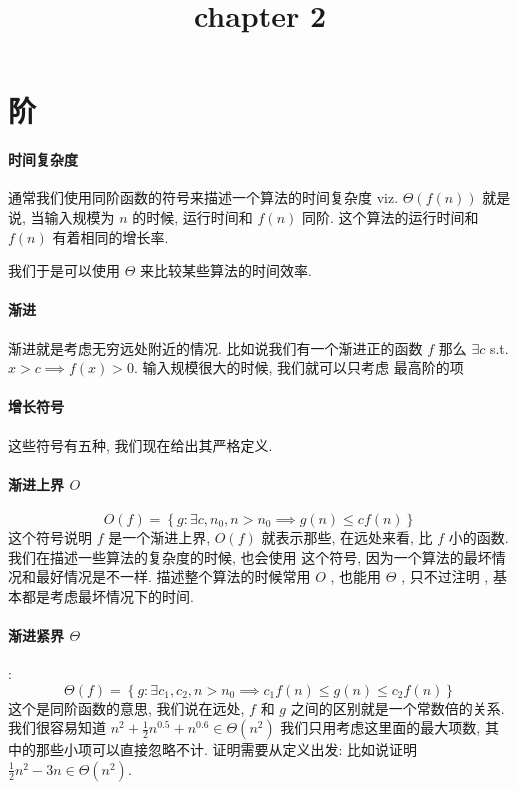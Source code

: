 \documentclass[a4paper, 10pt]{ctexart} %
\title{chapter 2}
\begin{document}
\maketitle
\tableofcontents
\section{阶}
\paragraph*{时间复杂度} 通常我们使用同阶函数的符号来描述一个算法的时间复杂度 viz. $\varTheta \left( f(n)\right)$  就是说, 当输入规模为 $n$ 的时候, 
运行时间和 $ f\left(n\right)$ 同阶. 这个算法的运行时间和 $f\left(n\right)$ 有着相同的增长率. 

我们于是可以使用 $\varTheta$ 来比较某些算法的时间效率. 

\paragraph*{渐进} 渐进就是考虑无穷远处附近的情况. 比如说我们有一个渐进正的函数 $f$
那么 $\exists c$ s.t. $x > c \implies f(x) > 0$. 输入规模很大的时候, 我们就可以只考虑
最高阶的项

\paragraph*{增长符号} 这些符号有五种, 我们现在给出其严格定义.

\paragraph*{渐进上界 $O$}  
\[
O \left(f \right) = \left\{ g : \exists c , n_{0}, n > n_{0} \implies g  \left(n\right) \le c f\left(n\right) \right\}
\]
这个符号说明 $f$ 是一个渐进上界, $O\left(f\right)$ 就表示那些, 在远处来看, 比 $f$ 小的函数. 我们在描述一些算法的复杂度的时候, 也会使用
这个符号, 因为一个算法的最坏情况和最好情况是不一样. 描述整个算法的时候常用 $O$ , 也能用 $\Theta$ , 只不过注明 , 基本都是考虑最坏情况下的时间.


\paragraph*{渐进紧界 $\varTheta$} :
\[
\varTheta \left(f\right) = \left\{g: \exists c_{1} , c_2, n > n_{0} \implies  c_{1} f\left(n\right) \le g\left(n\right) \le c_{2} f\left(n\right)\right\}
\]
这个是同阶函数的意思, 我们说在远处, $f$ 和 $g$ 之间的区别就是一个常数倍的关系. 我们很容易知道 
$ n^{2} + \frac{1}{2} n^{0.5} +  n^{0.6} \in \Theta \left(n^{2}\right)$ 
我们只用考虑这里面的最大项数, 其中的那些小项可以直接忽略不计. 证明需要从定义出发:
比如说证明 $\frac{1}{2} n^{2} - 3n \in \Theta \left(n^{2}\right)$. 
\end{document}
